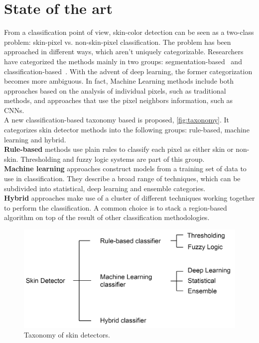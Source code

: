 \section{State of the art}\label{sec:state-of-the-art}

From a classification point of view, skin-color detection can be seen as a two-class problem: skin-pixel vs. non-skin-pixel classification. The problem has been approached in different ways, which aren't uniquely categorizable.
Researchers have categorized the methods mainly in two groups: segmentation-based~\cite{naji2019survey} and classification-based~\cite{brancati2017human}. With the advent of deep learning, the former categorization becomes more ambiguous. In fact, Machine Learning methods include both approaches based on the analysis of individual pixels, such as traditional methods, and approaches that use the pixel neighbors information, such as CNNs.\\
A new classification-based taxonomy based is proposed, \autoref{fig:taxonomy}. It categorizes skin detector methods into the following groups: rule-based, machine learning and hybrid.\\
\textbf{Rule-based} methods use plain rules to classify each pixel as either skin or non-skin. Thresholding and fuzzy logic systems are part of this group.\\
\textbf{Machine learning} approaches construct models from a training set of data to use in classification.
They describe a broad range of techniques, which can be subdivided into statistical, deep learning and ensemble categories.\\
\textbf{Hybrid} approaches make use of a cluster of different techniques working together to perform the classification. A common choice is to stack a region-based algorithm on top of the result of other classification methodologies. \\

\begin{figure}[h]
	\centering
	\includegraphics[width=0.9\linewidth]{images/introduction/taxonomy.png}
	\caption{Taxonomy of skin detectors.}
	\label{fig:taxonomy}
\end{figure}

